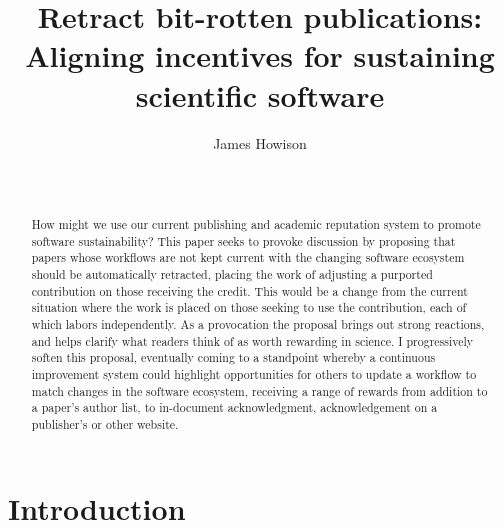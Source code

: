 \documentclass{sigchi}
\begin{document}
\title{Retract bit-rotten publications: Aligning incentives for sustaining scientific software}

\author{
  \alignauthor James Howison\\
    \\
    \\
}

\maketitle

\begin{abstract}
How might we use our current publishing and academic reputation system to promote software sustainability? This paper seeks to provoke discussion by proposing that papers whose workflows are not kept current with the changing software ecosystem should be automatically retracted, placing the work of adjusting a purported contribution on those receiving the credit. This would be a change from the current situation where the work is placed on those seeking to use the contribution, each of which labors independently. As a provocation the proposal brings out strong reactions, and helps clarify what readers think of as worth rewarding in science. I progressively soften this proposal, eventually coming to a standpoint whereby a continuous improvement system could highlight opportunities for others to update a workflow to match changes in the software ecosystem, receiving a range of rewards from addition to a paper's author list, to in-document acknowledgment, acknowledgement on a publisher's or other website.
\end{abstract}

%




\section{Introduction}
\end{document}
